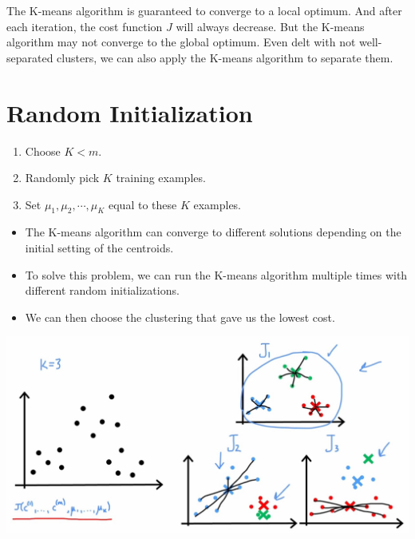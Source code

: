 The K-means algorithm is guaranteed to converge to a local optimum. And after each iteration, 
the cost function $J$ will always decrease. But the K-means algorithm may not converge to the global optimum.
Even delt with not well-separated clusters, we can also apply the K-means algorithm to separate them.
\section{Random Initialization}

\begin{notebox}
\begin{enumerate}
    \item Choose $K<m$. 
    \item Randomly pick $K$ training examples.
    \item Set $\mu_1, \mu_2, \cdots, \mu_K$ equal to these $K$ examples.
\end{enumerate}
\tcblower
\begin{itemize}
    \item The K-means algorithm can converge to different solutions depending on the initial setting of the centroids.
    \item To solve this problem, we can run the K-means algorithm multiple times with different random initializations.
    \item We can then choose the clustering that gave us the lowest cost.
\end{itemize}
\end{notebox}

\begin{center}
    \includegraphics*[width=\textwidth]{images/km3}
\end{center}

